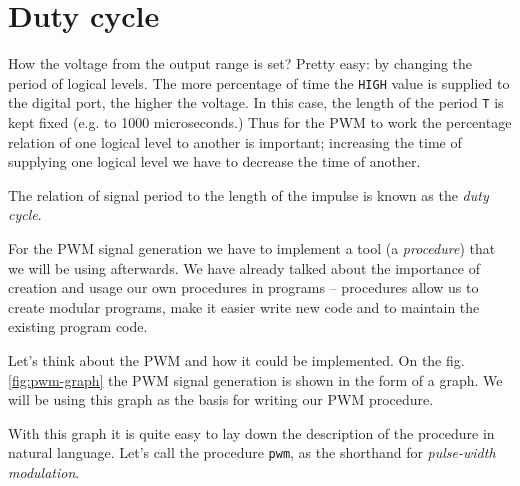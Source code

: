 \documentclass[../sparc.tex]{subfiles}
\begin{document}
\section{Duty cycle}

How the voltage from the output range is set?  Pretty easy: by changing the
period of logical levels.  The more percentage of time the \texttt{HIGH} value
is supplied to the digital port, the higher the voltage.  In this case, the
length of the period \texttt{T} is kept fixed (e.g. to 1000 microseconds.)  Thus
for the \gls{PWM} to work the percentage relation of one logical level to
another is important; increasing the time of supplying one logical level we have
to decrease the time of another.


The relation of signal period to the length of the impulse is known as the
\emph{duty cycle}.


For the PWM signal generation we have to implement a tool (a \emph{procedure})
that we will be using afterwards.  We have already talked about the importance
of creation and usage our own procedures in programs -- procedures allow us to
create modular programs, make it easier write new code and to maintain the
existing program code.


Let's think about the \gls{PWM} and how it could be implemented.  On the
fig. \ref{fig:pwm-graph} the PWM signal generation is shown in the form of a
graph.  We will be using this graph as the basis for writing our PWM procedure.

With this graph it is quite easy to lay down the description of the procedure in
natural language.  Let's call the procedure \texttt{pwm}, as the shorthand for
\emph{pulse-width modulation}.
\end{document}
